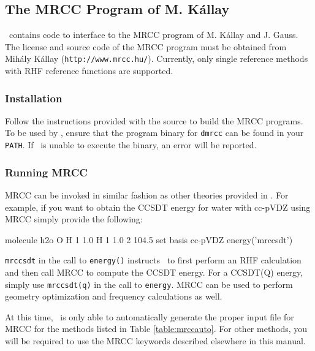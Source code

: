 \subsection{The MRCC Program of M. K\'{a}llay} \label{sec:mrcc}
\PSIfour\ contains code to interface to the MRCC program of M. K\'{a}llay
and J. Gauss.  The license and source code of the MRCC program must be
obtained from Mih\'{a}ly K\'{a}llay ({\tt http://www.mrcc.hu/}). Currently, only single reference methods with RHF reference functions are supported.
\renewcommand{\optionname}[2]{\texttt{\nameref{op-#2-#1}}}

\subsubsection{Installation}
Follow the instructions provided with the source to build the MRCC programs. To be used by \PSIfour, ensure that the program binary for {\tt dmrcc} can be found in your {\tt PATH}. If \PSIfour\ is unable to execute the binary, an error will be reported.

\subsubsection{Running MRCC}
MRCC can be invoked in similar fashion as other theories provided in \PSIfour. For example, if you want to obtain the CCSDT energy for water with cc-pVDZ using MRCC simply provide the following:
\begin{Snippet}
molecule h2o {
    O
    H 1 1.0
    H 1 1.0 2 104.5
}
set {
    basis cc-pVDZ
}
energy('mrccsdt')
\end{Snippet}

{\tt mrccsdt} in the call to {\tt energy()} instructs \PSIfour\ to first perform an RHF calculation and then call MRCC to compute the CCSDT energy. For a CCSDT(Q) energy, simply use {\tt mrccsdt(q)} in the call to {\tt energy}.  MRCC can be used to perform geometry optimization and frequency calculations as well.

At this time, \PSIfour\ is only able to automatically generate the proper
input file for MRCC for the methods listed in Table \ref{table:mrccauto}. For other methods, you will be required to use the MRCC keywords described elsewhere in this manual.

